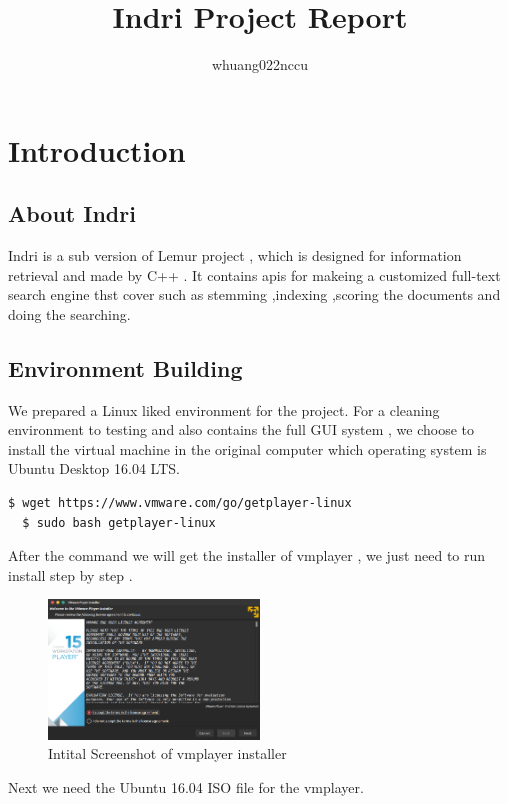 \documentclass{article}
\title{Indri Project Report}
\author{whuang022nccu}
\begin{document}
\maketitle
\section{Introduction}
\subsection{About Indri}
  Indri is a sub version of Lemur project 
  , which is designed for information retrieval and made by C++
  . It contains apis for makeing a customized full-text search engine 
  thst cover such as stemming ,indexing 
  ,scoring the documents and doing the searching.
\subsection{Environment Building}
We prepared a Linux liked environment for the project.
For a cleaning environment to testing and also contains the full GUI system
, we choose to install the virtual machine in the original computer 
which operating system is Ubuntu Desktop 16.04 LTS.

\begin{lstlisting}[language=bash,caption={Install VMware Workstation Player}]
  $ wget https://www.vmware.com/go/getplayer-linux
  $ sudo bash getplayer-linux 
\end{lstlisting}
After the command we will get the installer of vmplayer 
, we just need to run install step by step .

\begin{figure}[H]
  \begin{center}
  \includegraphics[width=0.5\textwidth]{image/open_the_vmplayer_install.png}
  \caption{Intital Screenshot of vmplayer installer}
  \label{fig:env_01}
  \end{center}
\end{figure}

Next we need the Ubuntu 16.04 ISO file for the vmplayer.
\end{document}
